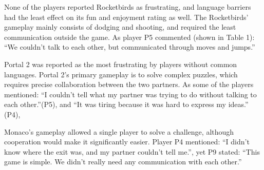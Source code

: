None of the players reported Rocketbirds as frustrating, and language barriers had the least effect on its fun and enjoyment rating as well.
The Rocketbirds' gameplay mainly consists of dodging and shooting, and required the least communication outside the game. As player P5 commented (shown in Table 1): ``We couldn't talk to each other, but communicated through moves and jumps.'' 
 



Portal 2 was reported as the most frustrating by players without common languages. Portal 2's primary gameplay is to solve complex puzzles, which requires precise collaboration between the two partners. As some of the players mentioned: ``I couldn't tell what my partner was trying to do without talking to each other.''(P5), and ``It was tiring because it was hard to express my ideas.'' (P4),



Monaco's gameplay allowed a single player to solve a challenge, although cooperation would make it significantly easier. Player P4 mentioned: ``I didn't know where the exit was, and my partner couldn't tell me.'', yet P9 stated:  ``This game is simple. We didn't really need any communication with each other.''

